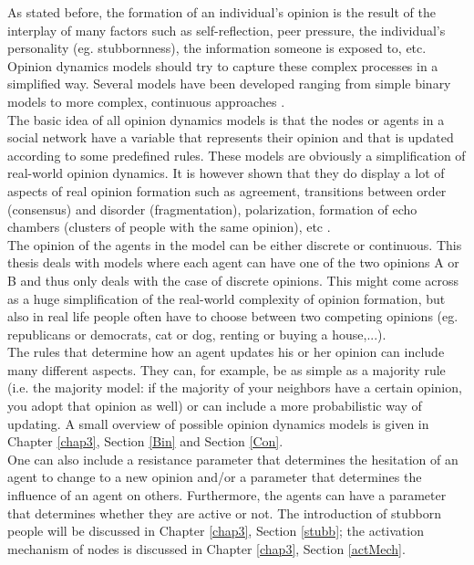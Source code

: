 \documentclass[11 pt , letterpaper , twoside , openright]{book}
\begin{document}
As stated before, the formation of an individual's opinion is the result of the interplay of many factors such as self-reflection, peer pressure, the individual's personality (eg. stubbornness), the information someone is exposed to, etc.  Opinion dynamics models should try to capture these complex processes in a simplified way. Several models have been developed ranging from simple binary models to more complex, continuous approaches \cite{Sirbu2016}.\\
The basic idea of all opinion dynamics models is that the nodes or agents in a social network have a variable that represents their opinion and that is updated according to some predefined rules. These models are obviously a simplification of real-world opinion dynamics. It is however shown that they do display a lot of aspects of real opinion formation such as agreement, transitions between order (consensus) and disorder (fragmentation), polarization, formation of echo chambers (clusters of people with the same opinion), etc \cite{Sirbu2016}. \\
\newline
The opinion of the agents in the model can be either discrete or continuous. This thesis deals with models where each agent can have one of the two opinions A or B and thus only deals with the case of discrete opinions. This might come across as a huge simplification of the real-world complexity of opinion formation, but also in real life people often have to choose between two competing opinions (eg. republicans or democrats, cat or dog, renting or buying a house,...). \\
\newline
The rules that determine how an agent updates his or her opinion can include many different aspects. They can, for example, be as simple as a majority rule (i.e. the majority model: if the majority of your neighbors have a certain opinion, you adopt that opinion as well) or can include a more probabilistic way of updating. A small overview of possible opinion dynamics models is given in Chapter \ref{chap3}, Section \ref{Bin} and Section \ref{Con}. \\
One can also include a resistance parameter that determines the hesitation of an agent to change to a new opinion and/or a parameter that determines the influence of an agent on others. Furthermore, the agents can have a parameter that determines whether they are active or not. The introduction of stubborn people will be discussed in Chapter \ref{chap3}, Section \ref{stubb}; the activation mechanism of nodes is discussed in Chapter \ref{chap3}, Section \ref{actMech}.\\
\end{document}
